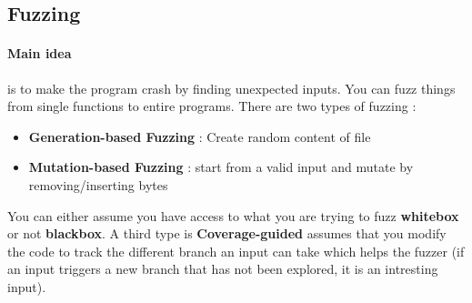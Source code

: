 \subsection{Fuzzing}
\paragraph{Main idea} is to make the program crash by finding unexpected inputs. You can fuzz things from single functions to entire programs. There are two types of fuzzing : 
\begin{itemize}
    \item \textbf{Generation-based Fuzzing} : Create random content of file 
    \item \textbf{Mutation-based Fuzzing} : start from a valid input and mutate by removing/inserting bytes 
\end{itemize}

You can either assume you have access to what you are trying to fuzz \textbf{whitebox} or not \textbf{blackbox}. A third type is \textbf{Coverage-guided} assumes that you modify the code to track the different branch an input can take which helps the fuzzer (if an input triggers a new branch that has not been explored, it is an intresting input).